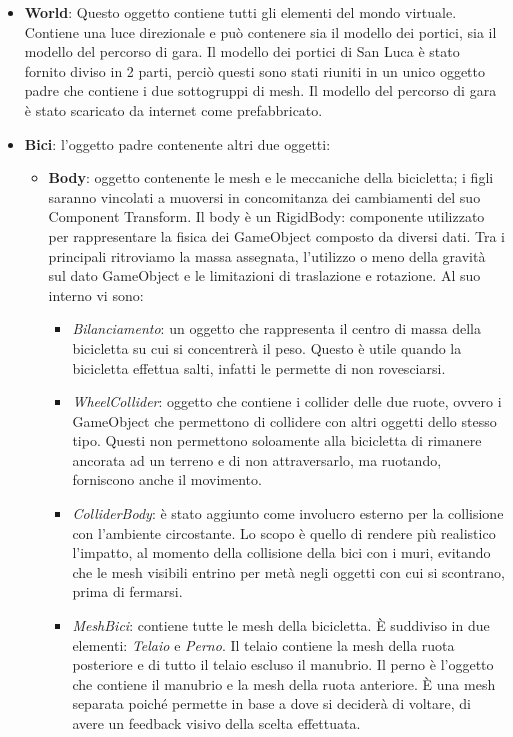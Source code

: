 \begin{itemize}
  \item \textbf{World}: Questo oggetto contiene tutti gli elementi del mondo virtuale. Contiene una luce direzionale e può contenere sia il modello dei portici, sia il modello del percorso di gara. Il modello dei portici di San Luca è stato fornito diviso in 2 parti, perciò questi sono stati riuniti in un unico oggetto padre che contiene i due sottogruppi di mesh. Il modello del percorso di gara è stato scaricato da internet come prefabbricato.
  \item \textbf{Bici}: l'oggetto padre contenente altri due oggetti:
		\begin{itemize}
  			\item \textbf{Body}: oggetto contenente le mesh e le meccaniche della bicicletta; i figli saranno vincolati a muoversi in concomitanza dei cambiamenti del suo Component Transform. Il body è un RigidBody: componente utilizzato per rappresentare la fisica dei GameObject composto da diversi dati. Tra i principali ritroviamo la massa assegnata, l’utilizzo o meno della gravità sul dato GameObject e le limitazioni di traslazione e rotazione. Al suo interno vi sono:
					\begin{itemize}
			  			\item \textit{Bilanciamento}: un oggetto che rappresenta il centro di massa della bicicletta su cui si concentrerà il peso. Questo è utile quando la bicicletta effettua salti, infatti le permette di non rovesciarsi.
			  			\item \textit{WheelCollider}: oggetto che contiene i collider delle due ruote, ovvero i GameObject che permettono di collidere con altri oggetti dello stesso tipo. Questi non permettono soloamente alla bicicletta di rimanere ancorata ad un terreno e di non attraversarlo, ma ruotando, forniscono anche il movimento.
						\item \textit{ColliderBody}: è stato aggiunto come involucro esterno per la collisione con l’ambiente circostante. Lo scopo è quello di rendere più realistico l'impatto, al momento della collisione della bici con i muri, evitando che le mesh visibili entrino per metà negli oggetti con cui si scontrano, prima di fermarsi.
						\item \textit{MeshBici}: contiene tutte le mesh della bicicletta. È suddiviso in due elementi: \textit{Telaio} e \textit{Perno}. Il telaio contiene la mesh della ruota posteriore e di tutto il telaio escluso il manubrio. Il perno è l'oggetto che contiene il manubrio e la mesh della ruota anteriore. È una mesh separata poiché permette in base a dove si deciderà di voltare, di avere un feedback visivo della scelta effettuata.

\end{itemize}
\end{itemize}
\end{itemize}
